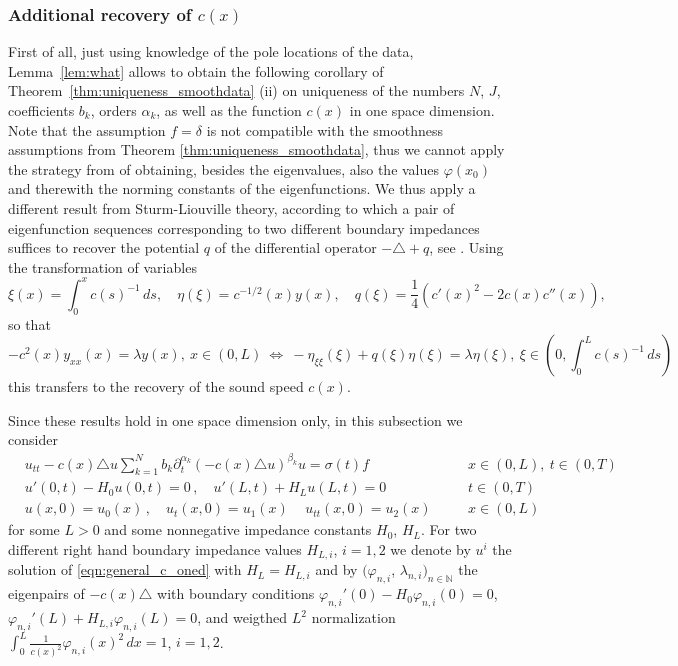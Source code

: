 \subsubsection{Additional recovery of $c(x)$}

First of all, just using knowledge of the pole locations of the data,
Lemma~\ref{lem:what} allows to obtain the following corollary of
Theorem~\ref{thm:uniqueness_smoothdata} (ii) on uniqueness of the numbers $N$, $J$,
coefficients $b_k$, orders $\alpha_k$, as well as the function $c(x)$ in one space
dimension. Note that the assumption $f=\delta$ is not compatible with the
smoothness assumptions from Theorem \ref{thm:uniqueness_smoothdata}, thus we cannot
apply the strategy from \cite{KaltenbacherRundell:2021b} of obtaining, besides the
eigenvalues, also the values $\varphi(x_0)$ and therewith the norming constants of
the eigenfunctions.
We thus apply a different result from Sturm-Liouville theory,
according to which a pair of eigenfunction sequences corresponding to two different
boundary impedances  suffices to recover the potential $q$ of the differential
operator $-\triangle + q$, see \cite{RundellSacks:1992a,CCPR:1997}.
Using the transformation of variables 
\[
\xi(x)=\int_0^xc(s)^{-1}\, ds, \quad \eta(\xi)=c^{-1/2}(x) y(x), \quad q(\xi)= \frac14(c'(x)^2-2c(x)c''(x)),
\]
so that
\[
-c^2(x)y_{xx}(x)=\lambda y(x), \ x\in (0,L) \ \Leftrightarrow \
-\eta_{\xi\xi}(\xi)+q(\xi)\eta(\xi)=\lambda\eta(\xi), \ \xi\in (0,\int_0^Lc(s)^{-1}\, ds) 
\]
this transfers to the recovery of the sound speed $c(x)$.

Since these results hold in one space dimension only, in this subsection we consider 
\begin{equation}\label{eqn:general_c_oned}
\begin{aligned}
&u_{tt}-c(x)\triangle u
\sum_{k=1}^N b_k \partial_t^{\alpha_k} (-c(x)\triangle u)^{\beta_k}u=\sigma(t)f\quad && x\in (0,L), \ t\in(0,T)\\
&u'(0,t)-H_0u(0,t)=0\,,\quad u'(L,t)+H_Lu(L,t)=0\quad && t\in(0,T)\\
&u(x,0)=u_0(x)\,, \quad u_t(x,0)=u_1(x)\, \quad u_{tt}(x,0)=u_2(x)\quad &&x\in(0,L)
\end{aligned}
\end{equation}
for some $L>0$ and some nonnegative impedance constants $H_0$, $H_L$.
For two different right hand boundary impedance values $H_{L,i}$, $i=1,2$ we denote by $u^i$ the solution of \eqref{eqn:general_c_oned} with $H_L=H_{L,i}$ and by 
$(\varphi_{n,i}$, $\lambda_{n,i})_{n\in\mathbb{N}}$ the eigenpairs of $-c(x)\triangle$ with boundary conditions $\varphi_{n,i}'(0)-H_0\varphi_{n,i}(0)=0$, $\varphi_{n,i}'(L)+H_{L,i}\varphi_{n,i}(L)=0$, 
and weigthed $L^2$ normalization $\int_0^L \frac{1}{c(x)^2}\varphi_{n,i}(x)^2\, dx = 1$, $i=1,2$.


